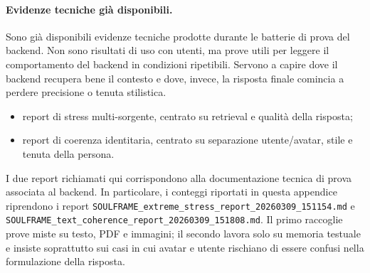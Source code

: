 \paragraph{Evidenze tecniche già disponibili.}
Sono già disponibili evidenze tecniche prodotte durante le batterie di prova del backend. Non sono risultati di uso con utenti, ma prove utili per leggere il comportamento del backend in condizioni ripetibili. Servono a capire dove il backend recupera bene il contesto e dove, invece, la risposta finale comincia a perdere precisione o tenuta stilistica.

\begin{itemize}
\item report di stress multi-sorgente, centrato su retrieval e qualità della risposta;
\item report di coerenza identitaria, centrato su separazione utente/avatar, stile e tenuta della persona.
\end{itemize}

I due report richiamati qui corrispondono alla documentazione tecnica di prova associata al backend. In particolare, i conteggi riportati in questa appendice riprendono i report \texttt{SOULFRAME\_extreme\_stress\_report\_20260309\_151154.md} e \texttt{SOULFRAME\_text\_coherence\_report\_20260309\_151808.md}. Il primo raccoglie prove miste su testo, PDF e immagini; il secondo lavora solo su memoria testuale e insiste soprattutto sui casi in cui avatar e utente rischiano di essere confusi nella formulazione della risposta.


